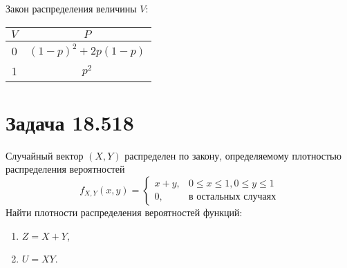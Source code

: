 Закон распределения величины $V$:

\begin{tabular}{|c|c|}
    \hline
    $V$ & $P$                   \\
    \hline
    0   & $(1-p)^2 + 2 p (1-p)$ \\
    \hline
    1   & $p^2$                 \\
    \hline
\end{tabular}

\section*{Задача 18.518}

Случайный вектор $\left ( X, Y \right )$ распределен по закону, определяемому плотностью распределения вероятностей
$$
f_{X, Y} ( x, y )
= \left \{
\begin{array}{ll}
    x + y, & 0 \le x \le 1, 0 \le y \le 1 \\
    0,     & \text{в остальных случаях}
\end{array}
\right .
$$
Найти плотности распределения вероятностей функций:
\begin{enumerate}
    \item $Z = X + Y$,
    \item $U = XY$.
\end{enumerate}

